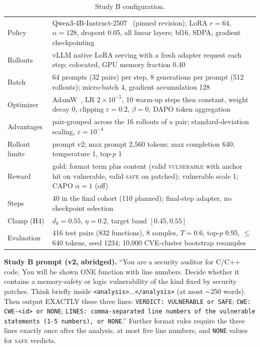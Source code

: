 \documentclass[journal]{IEEEtran}
\newcommand{\vuln}{\textsc{vulnerable}}
\newcommand{\safe}{\textsc{safe}}
\begin{document}
\begin{table}[!ht]
\centering\scriptsize\setlength{\tabcolsep}{3pt}
\caption{Study B configuration.}
\label{tab:implB}
\begin{tabular}{p{1.7cm}p{6.4cm}}
\toprule
Policy & Qwen3-4B-Instruct-2507~\cite{qwen3} (pinned revision); LoRA $r{=}64$, $\alpha{=}128$, dropout 0.05, all linear layers; bf16, SDPA, gradient checkpointing\\
Rollouts & vLLM native LoRA serving with a fresh adapter request each step; colocated, GPU memory fraction 0.40\\
Batch & 64 prompts (32 pairs) per step, 8 generations per prompt (512 rollouts); micro-batch 4, gradient accumulation 128\\
Optimizer & AdamW~\cite{adamw}, LR $2{\times}10^{-5}$, 10 warm-up steps then constant, weight decay 0, clipping $\varepsilon{=}0.2$, $\beta{=}0$, DAPO token aggregation\\
Advantages & pair-grouped across the 16 rollouts of a pair; standard-deviation scaling, $\varepsilon{=}10^{-4}$\\
Rollout limits & prompt v2; max prompt 2,560 tokens; max completion 640; temperature 1, top-$p$ 1\\
Reward & gold: format term plus content (valid \vuln{} with anchor hit on vulnerable, valid \safe{} on patched); vulnerable scale 1; CAPO $\alpha{=}1$ (off)\\
Steps & 40 in the final cohort (110 planned); final-step adapter, no checkpoint selection\\
Clamp (H4) & $d_k{=}0.55$, $\eta{=}0.2$, target band $[0.45,0.55]$\\
Evaluation & 416 test pairs (832 functions), 8 samples, $T{=}0.6$, top-$p$ 0.95, $\le$640 tokens, seed 1234; 10,000 CVE-cluster bootstrap resamples\\
\bottomrule
\end{tabular}
\end{table}

\textbf{Study B prompt (v2, abridged).} ``You are a security auditor for C/C++ code. You will be shown ONE function with line numbers. Decide whether it contains a memory-safety or logic vulnerability of the kind fixed by security patches. Think briefly inside \texttt{<analysis>}$\dots$\texttt{</analysis>} (at most $\sim$250 words). Then output EXACTLY these three lines: \texttt{VERDICT: VULNERABLE or SAFE}; \texttt{CWE: CWE-<id> or NONE}; \texttt{LINES: comma-separated line numbers of the vulnerable statements (1-5 numbers), or NONE}.'' Further format rules require the three lines exactly once after the analysis, at most five line numbers, and \texttt{NONE} values for \safe{} verdicts.
\end{document}

